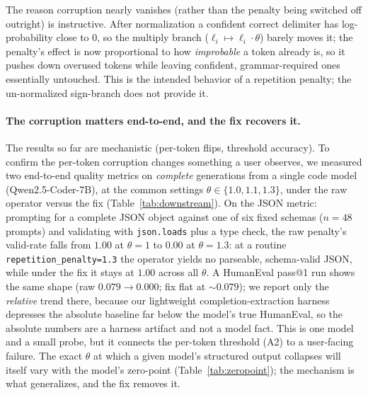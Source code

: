 \documentclass[11pt]{article}
\makeatletter
\newcommand{\thp}{\theta}
\newcommand{\code}[1]{\texttt{#1}}
\newcommand{\passk}[1]{pass@#1}
\makeatother
\begin{document}
The reason corruption nearly vanishes (rather than the penalty being switched
off outright) is instructive. After normalization a confident correct delimiter has
log-probability close to $0$, so the multiply branch ($\ell_i \mapsto \ell_i\cdot\thp$)
barely moves it; the penalty's effect is now proportional to how \emph{improbable} a token
already is, so it pushes down overused tokens while leaving confident,
grammar-required ones essentially untouched. This is the intended behavior of a repetition
penalty; the un-normalized sign-branch does not provide it.

\paragraph{The corruption matters end-to-end, and the fix recovers it.} The results so far are
mechanistic (per-token flips, threshold accuracy). To confirm the per-token corruption changes
something a user observes, we measured two end-to-end quality metrics on \emph{complete}
generations from a single code model (Qwen2.5-Coder-7B), at the common settings
$\thp\in\{1.0,1.1,1.3\}$, under the raw operator versus the fix (Table~\ref{tab:downstream}).
On the JSON metric: prompting for a complete JSON object against one
of six fixed schemas ($n=48$ prompts) and validating with \code{json.loads} plus a type check,
the raw penalty's valid-rate falls from $1.00$ at $\thp=1$ to $0.00$ at
$\thp=1.3$: at a routine \code{repetition\_penalty=1.3} the operator yields no
parseable, schema-valid JSON, while under the fix it stays at $1.00$ across all $\thp$. A
HumanEval \passk{1} run shows the same shape (raw $0.079\to0.000$; fix flat at ${\sim}0.079$);
we report only the \emph{relative} trend there, because our lightweight completion-extraction
harness depresses the absolute baseline far below the model's true HumanEval, so the absolute
numbers are a harness artifact and not a model fact. This is one model and a small probe, but
it connects the per-token threshold (A2) to a user-facing failure. The exact
$\thp$ at which a given model's structured output collapses will itself vary with the model's
zero-point (Table~\ref{tab:zeropoint}); the mechanism is what generalizes, and the fix removes
it.
\end{document}
